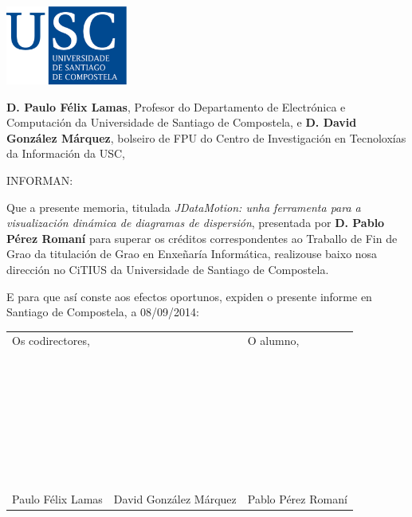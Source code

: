 \pagestyle{plain}
\includegraphics[width=4cm]{figuras/logo_usc.eps}

\vspace{1cm}
{\bf D. Paulo Félix Lamas}, Profesor do Departamento de Electrónica e Computación da Universidade de Santiago de Compostela, e {\bf D. David González Márquez}, bolseiro de FPU do Centro de Investigación en Tecnoloxías da Información da USC,

\vspace{1cm}
INFORMAN:

\vspace{1cm}
Que a presente memoria, titulada {\it JDataMotion: unha ferramenta para a visualización dinámica de diagramas de dispersión}, presentada por {\bf D. Pablo Pérez Romaní} para superar os créditos correspondentes ao Traballo de Fin de Grao da titulación de Grao en Enxeñaría Informática, realizouse baixo nosa dirección no CiTIUS da Universidade de Santiago de Compostela.

\vspace{1cm}
E para que así conste aos efectos oportunos, expiden o presente informe en Santiago de Compostela, a 08/09/2014:

\vspace{2cm}
\begin{tabular}{lll}
Os codirectores, && O alumno, \\
~ \\
~ \\
~ \\
~ \\
~ \\
~ \\
~ \\
Paulo Félix Lamas & David González Márquez & Pablo Pérez Romaní
\end{tabular}

